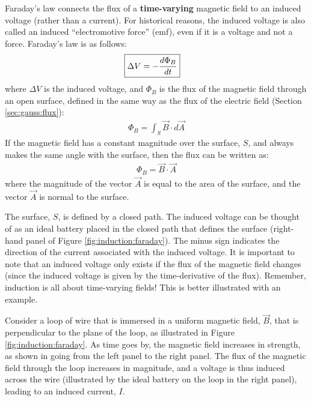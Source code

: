 Faraday's law connects the flux of a \textbf{time-varying} magnetic field to an induced voltage (rather than a current). For historical reasons, the induced voltage is also called an induced ``electromotive force'' (emf), even if it is a voltage and not a force. Faraday's law is as follows:
\begin{align*}
\Aboxed{\Delta V = -\frac{d\Phi_B}{dt}}
\end{align*}
where $\Delta V$ is the induced voltage, and  $\Phi_B$ is the flux of the magnetic field through an open surface, defined in the same way as the flux of the electric field (Section \ref{sec:gauss:flux}):
\begin{align*}
\Phi_B = \int_S \vec B\cdot d\vec A
\end{align*}
If the magnetic field has a constant magnitude over the surface, $S$, and always makes the same angle with the surface, then the flux can be written as:
\begin{align*}
\Phi_B =  \vec B\cdot\vec A
\end{align*}
where the magnitude of the vector $\vec A$ is equal to the area of the surface, and the vector $\vec A$ is normal to the surface.

The surface, $S$, is defined by a closed path. The induced voltage can be thought of as an ideal battery placed in the closed path that defines the surface (right-hand panel of Figure \ref{fig:induction:faraday}). The minus sign indicates the direction of the current associated with the induced voltage. It is important to note that an induced voltage only exists if the flux of the magnetic field changes (since the induced voltage is given by the time-derivative of the flux). Remember, induction is all about time-varying fields! This is better illustrated with an example.

Consider a loop of wire that is immersed in a uniform magnetic field, $\vec B$, that is perpendicular to the plane of the loop, as illustrated in Figure \ref{fig:induction:faraday}. As time goes by, the magnetic field increases in strength, as shown in going from the left panel to the right panel. The flux of the magnetic field through the loop increases in magnitude, and a voltage is thus induced across the wire (illustrated by the ideal battery on the loop in the right panel), leading to an induced current, $I$.


